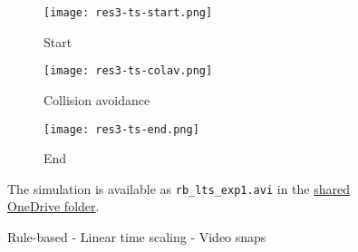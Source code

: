 \begin{figure}[ht]
    \centering
    \begin{subfigure}[b]{0.3\textwidth}
        \texttt{[image: res3-ts-start.png]}
        \caption{Start}
    \end{subfigure}
    \begin{subfigure}[b]{0.3\textwidth}
        \texttt{[image: res3-ts-colav.png]}
        \caption{Collision avoidance}
    \end{subfigure}
    \begin{subfigure}[b]{0.3\textwidth}
        \texttt{[image: res3-ts-end.png]}
        \caption{End}
    \end{subfigure}
    \caption{Rule-based - Linear time scaling - Video snaps}
    \label{fig:rb-lts-exp1}
    \small
        The simulation is available as \texttt{rb\_lts\_exp1.avi} in the \href{https://iiitaphyd-my.sharepoint.com/:f:/g/personal/avneesh_mishra_research_iiit_ac_in/Er_wRqK4hxVLjVdL56rfDxYBKr9PPed1laN48hLgLisf4w}{shared OneDrive folder}.
\end{figure}
